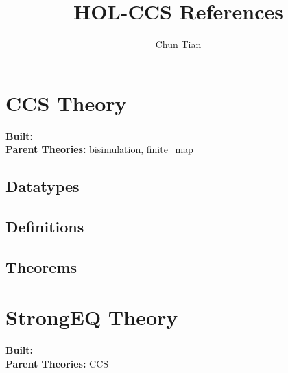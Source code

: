\documentclass[11pt, twoside]{article}
\title{HOL-CCS References}
\author{Chun Tian}
\begin{document}
\maketitle
















\tableofcontents
\cleardoublepage
\HOLpagestyle

\section{CCS Theory}
\begin{flushleft}
\textbf{Built:} \HOLCCSDate \\[2pt]
\textbf{Parent Theories:} bisimulation, finite_map
\end{flushleft}

\subsection{Datatypes}

\HOLCCSDatatypes

\subsection{Definitions}

\HOLCCSDefinitions

\subsection{Theorems}

\HOLCCSTheorems

\section{StrongEQ Theory}
\begin{flushleft}
\textbf{Built:} \HOLStrongEQDate \\[2pt]
\textbf{Parent Theories:} CCS
\end{flushleft}
\end{document}
